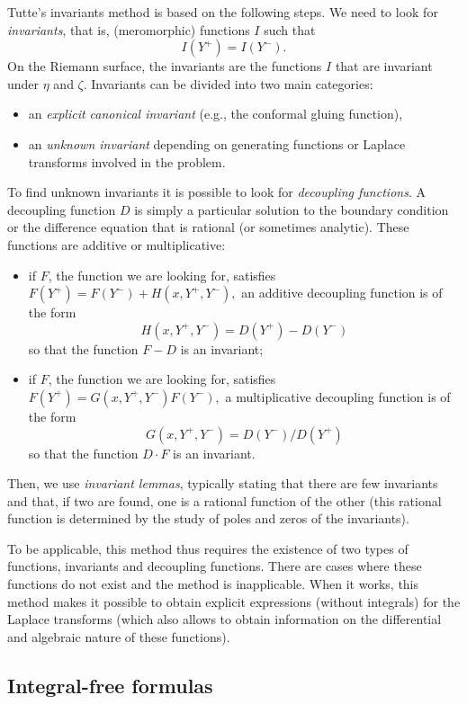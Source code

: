 \documentclass[11pt]{article}
\theoremstyle{definition}
\begin{document}
Tutte's invariants method is based on the following steps.
We need to look for \emph{invariants}, that is, (meromorphic) functions $I$ such that $$I(Y^+)=I(Y^-).$$ 
On the Riemann surface, the invariants are the functions $I$ that are invariant under $\eta$ and $\zeta$.
Invariants can be divided into two main categories:
\begin{itemize}
\item an \emph{explicit canonical invariant} (e.g., the conformal gluing function),
\item an \emph{unknown invariant} depending on generating functions or Laplace transforms involved in the problem.
\end{itemize} 
To find unknown invariants it is possible to look for \emph{decoupling functions}. A decoupling function $D$ is simply a particular solution to the boundary condition or the difference equation that is rational (or sometimes analytic). These functions are additive or multiplicative:
\begin{itemize}
\item if $F$, the function we are looking for, satisfies $F(Y^+)=F(Y^-)+H(x,Y^+,Y^-),$ an {additive decoupling function} is of the form 
     $$H(x,Y^+,Y^-)=D(Y^+)-D(Y^-)$$ so that the function $F-D$ is an invariant;
\item if $F$, the function we are looking for, satisfies $F(Y^+)=G(x,Y^+,Y^-)F(Y^-),$ a {multiplicative decoupling function} is of the form 
     $$G(x,Y^+,Y^-)=D(Y^-)/D(Y^+)$$ so that the function $D\cdot F$ is an invariant.
\end{itemize}
Then, we use \emph{invariant lemmas}, typically stating that there are few invariants and that, if two are found, one is a rational function of the other (this rational function is determined by the study of poles and zeros of the invariants).

To be applicable, this method thus requires the existence of two types of functions, invariants and decoupling functions. 
There are cases where these functions do not exist and the method is inapplicable.
When it works, this method makes it possible to obtain explicit expressions (without integrals) for the Laplace transforms (which also allows to obtain information on the differential and algebraic nature of these functions).     


\subsection{Integral-free formulas}
\end{document}
